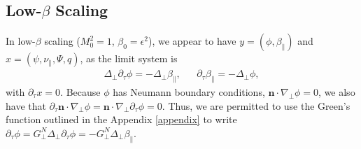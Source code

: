 \documentclass{article}
\newcommand{\para}{\parallel}
\newcommand{\ep}{\epsilon}
\newcommand{\np}{\nabla_\perp}
\newcommand{\lap}{\Delta_\perp}
\newcommand{\p}{\partial}
\newcommand{\GN}{G_\perp^N}
\newcommand{\pth} [1] {\left( #1 \right) }
\begin{document}
\subsection{Low-$\beta$ Scaling}
In low-$\beta$ scaling ($M_0^2=1$, $\beta_0=\ep^2$), we appear to have $y=\pth{\phi,\beta_\para}$ and $x=\pth{\psi, \nu_\para, \Psi, q}$, as the limit system is
\begin{align*}
    \lap\p_\tau\phi = -\lap\beta_\para, && \p_\tau\beta_\para = -\lap\phi,
\end{align*}
with $\p_\tau x=0$. Because $\phi$ has Neumann boundary conditions, $\bm{n}\cdot\np\phi=0$, we also have that $\p_\tau\bm{n}\cdot\np\phi = \bm{n}\cdot\np\p_\tau\phi = 0$. Thus, we are permitted to use the Green's function outlined in the Appendix \ref{appendix} to write $\p_\tau\phi = \GN\lap\p_\tau\phi = -\GN\lap\beta_\para$. 
\end{document}

